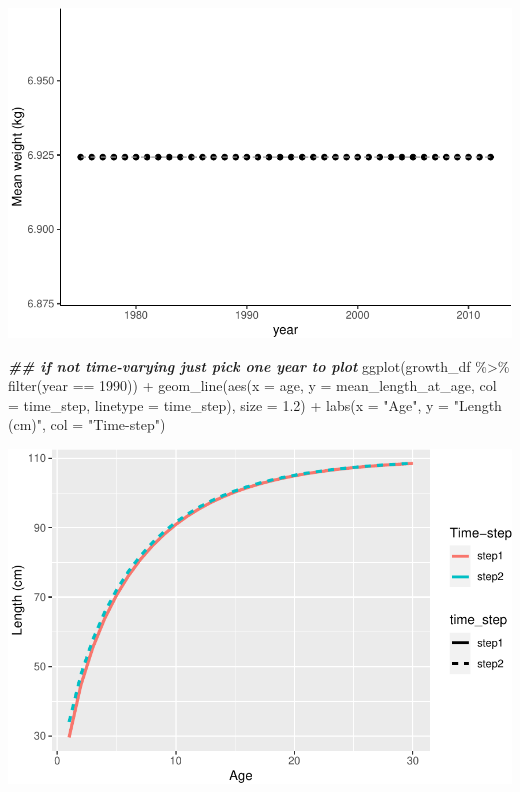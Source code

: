 \documentclass[
]{book}
\newenvironment{Shaded}{\begin{snugshade}}{\end{snugshade}}
\newcommand{\AttributeTok}[1]{\textcolor[rgb]{0.77,0.63,0.00}{#1}}
\newcommand{\DecValTok}[1]{\textcolor[rgb]{0.00,0.00,0.81}{#1}}
\newcommand{\DocumentationTok}[1]{\textcolor[rgb]{0.56,0.35,0.01}{\textbf{\textit{#1}}}}
\newcommand{\FloatTok}[1]{\textcolor[rgb]{0.00,0.00,0.81}{#1}}
\newcommand{\FunctionTok}[1]{\textcolor[rgb]{0.00,0.00,0.00}{#1}}
\newcommand{\NormalTok}[1]{#1}
\newcommand{\SpecialCharTok}[1]{\textcolor[rgb]{0.00,0.00,0.00}{#1}}
\newcommand{\StringTok}[1]{\textcolor[rgb]{0.31,0.60,0.02}{#1}}
\begin{document}
\includegraphics{_main_files/figure-latex/growth_df-2.pdf}

\begin{Shaded}
\begin{Highlighting}[]
\DocumentationTok{\#\# if not time{-}varying just pick one year to plot}
\FunctionTok{ggplot}\NormalTok{(growth\_df }\SpecialCharTok{\%\textgreater{}\%} \FunctionTok{filter}\NormalTok{(year }\SpecialCharTok{==} \DecValTok{1990}\NormalTok{)) }\SpecialCharTok{+}
  \FunctionTok{geom\_line}\NormalTok{(}\FunctionTok{aes}\NormalTok{(}\AttributeTok{x =}\NormalTok{ age, }\AttributeTok{y =}\NormalTok{ mean\_length\_at\_age, }\AttributeTok{col =}\NormalTok{ time\_step, }\AttributeTok{linetype =}\NormalTok{ time\_step), }\AttributeTok{size =} \FloatTok{1.2}\NormalTok{) }\SpecialCharTok{+}
  \FunctionTok{labs}\NormalTok{(}\AttributeTok{x =} \StringTok{"Age"}\NormalTok{, }\AttributeTok{y =} \StringTok{"Length (cm)"}\NormalTok{, }\AttributeTok{col =} \StringTok{"Time{-}step"}\NormalTok{)}
\end{Highlighting}
\end{Shaded}

\includegraphics{_main_files/figure-latex/growth_by_time_step_df-1.pdf}
\end{document}
